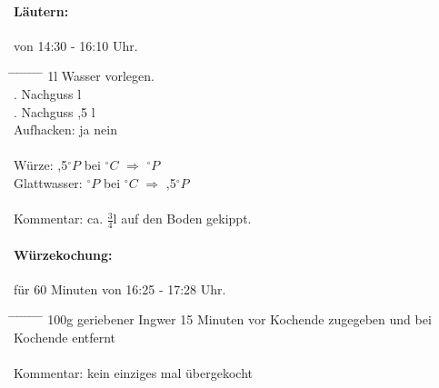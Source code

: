 \documentclass[12pt,oneside,a4paper]{scrartcl}
\begin{document}
{\paragraph{Läutern:} von 14:30 - 16:10 Uhr.
	\begin{tabbing}
		\hspace{1cm} \= \hspace{1cm} \= \hspace{1cm} \= \hspace{1cm} \= \hspace{1cm} \=\hspace{1cm} \=\hspace{1cm} \=\hspace{1cm} \= \kill
		\> 1l Wasser vorlegen.\\
		\> . Nachguss \> \> 3 l\\
		\> . Nachguss \> ,5 l\\
		\> \> \> Aufhacken: \> \> \CheckedBox ja \> \> \Square nein\\\\
		\> Würze: \> \> ,5$^\circ P$ \> bei $^\circ C$ \> $\Rightarrow$ $^\circ P$\\
		\> Glattwasser: \> \> $^\circ P$ \> bei $^\circ C$ \> $\Rightarrow$ ,5$^\circ P$\\\\
		\> Kommentar: \> \> \> ca. $\frac{3}{4}$l auf den Boden gekippt.
	\end{tabbing}
%
\paragraph{Würzekochung:} für 60 Minuten von 16:25 - 17:28 Uhr.
	\begin{tabbing}
		\hspace{1cm} \= \hspace{1cm} \= \hspace{1cm} \= \hspace{1cm} \= \hspace{1cm} \= \hspace{1cm} \= \hspace{1cm} \= \hspace{1cm} \= \kill
		\> 100g geriebener Ingwer 15 Minuten vor Kochende zugegeben und bei Kochende entfernt\\\\
		\> Kommentar: \> \> \> kein einziges mal übergekocht
	\end{tabbing}
%
}
\end{document}
